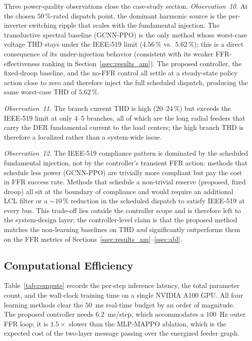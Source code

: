 Three power-quality observations close the case-study section.
\emph{Observation~10.} At the chosen $50$\,\%-rated dispatch point,
the dominant harmonic source is the per-inverter switching ripple
that scales with the fundamental injection. The transductive
spectral baseline (GCNN-PPO) is the only method whose worst-case
voltage THD stays under the IEEE-519 limit ($4.56$\,\% vs.\ $5.62$\,\%);
this is a direct consequence of its under-injection behavior
(consistent with its weaker FFR-effectiveness ranking in
Section~\ref{ssec:results_am}). The proposed controller, the
fixed-droop baseline, and the no-FFR control all settle at a
steady-state policy action close to zero and therefore inject the
full scheduled dispatch, producing the same worst-case THD of
$5.62$\,\%.

\emph{Observation~11.} The branch current THD is high
($20$--$24$\,\%) but exceeds the IEEE-519 limit at only $4$--$5$
branches, all of which are the long radial feeders that carry the
DER fundamental current to the load centers; the high branch THD
is therefore a localized rather than a system-wide issue.

\emph{Observation~12.} The IEEE-519 compliance pattern is dominated
by the scheduled fundamental injection, not by the controller's
transient FFR action: methods that schedule less power (GCNN-PPO)
are trivially more compliant but pay the cost in FFR success rate.
Methods that schedule a non-trivial reserve (proposed, fixed droop)
all sit at the boundary of compliance and would require an
additional LCL filter or a $\sim 10$\,\% reduction in the scheduled
dispatch to satisfy IEEE-519 at every bus. This trade-off lies
outside the controller scope and is therefore left to the
system-design layer; the controller-level claim is that the
proposed method matches the non-learning baselines on THD
\emph{and} significantly outperforms them on the FFR metrics of
Sections~\ref{ssec:results_am}--\ref{ssec:abl}.

\subsection{Computational Efficiency}
\label{ssec:compute}

Table~\ref{tab:compute} records the per-step inference latency, the
total parameter count, and the wall-clock training time on a single
NVIDIA A100 GPU. All four learning methods clear the $50$~ms
real-time budget by an order of magnitude. The proposed controller
needs $6.2$~ms/step, which accommodates a $100$~Hz outer FFR loop;
it is $1.5\times$ slower than the MLP-MAPPO ablation, which is the
expected cost of the two-layer message passing over the energized
feeder graph.


